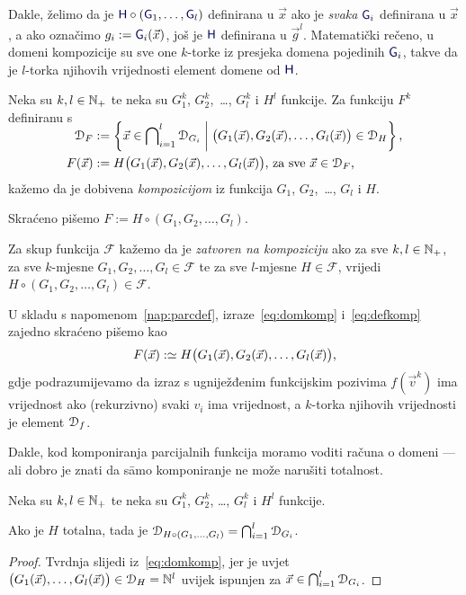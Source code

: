 Dakle, želimo da je $\f H\circ(\f G_1,\dotsc,\f G_l)$ definirana u $\vec x$ ako je \emph{svaka} $\f G_i$ definirana u $\vec x$, a ako označimo $g_i:=\f G_i(\vec x)$, još je $\f H$ definirana u $\vec g^{l}$. Matematički rečeno, u domeni kompozicije su sve one $k$-torke iz presjeka domena pojedinih $\f G_i$, takve da je $l$-torka njihovih vrijednosti element domene od $\f H$.
\begin{definicija}[{name=[kompozicija]}]
Neka su $k,l\in{\mathbb N}_+$ te neka su $G_1^k$, $G_2^k$,~\ldots, $G_l^k$ i $H^l$ funkcije. Za funkciju $F^k$ definiranu s
\begin{align}
\SwapAboveDisplaySkip
\label{eq:domkomp}
    \dom{F}&:=\left\{\vec x\in\bigcap\nolimits_{i=1}^l\dom{G_i}\;\middle|\;\bigl(G_1(\vec x),G_2(\vec x),\dotsc,G_l(\vec x)\bigr)\in\dom{H}\right\}\text,\\
\label{eq:defkomp}
    F(\vec x)&:=H\bigl(G_1(\vec x),G_2(\vec x),\dotsc,G_l(\vec x)\bigr)\text{, za sve $\vec x\in\dom F$,}
\end{align}
kažemo da je dobivena \emph{kompozicijom} iz funkcija $G_1$, $G_2$,~\ldots, $G_l$ i $H$.

	Skraćeno pišemo $F:=H\circ(G_1,G_2,\dotsc,G_l)$. %

Za skup funkcija $\mathcal F$ kažemo da je \emph{zatvoren na kompoziciju} ako za sve $k,l\in{\mathbb N}_+$, za sve $k$-mjesne $G_1,G_2,\dotsc,G_l\in\mathcal F$ te za sve $l$-mjesne $H\in\mathcal F$, vrijedi $H\circ(G_1,G_2,\dotsc,G_l)\in\mathcal F$.
\end{definicija}
U skladu s napomenom~\ref{nap:parcdef}, izraze~\eqref{eq:domkomp} i~\eqref{eq:defkomp} zajedno skraćeno pišemo kao
\begin{equation}
    F(\vec x):\simeq H\bigl(G_1(\vec x),G_2(\vec x),\dotsc,G_l(\vec x)\bigr)\text,
\end{equation}
gdje podrazumijevamo da izraz s ugniježđenim funkcijskim pozivima $f(\vec v^{k})$ ima vrijednost ako (rekurzivno) svaki $v_i$ ima vrijednost, a $k$-torka njihovih vrijednosti je element $\mathcal D_{f}$.

Dakle, kod komponiranja parcijalnih funkcija moramo voditi računa o domeni --- ali dobro je znati da s\=amo komponiranje ne može narušiti totalnost.

\begin{lema}[{name=[domena kompozicije slijeva s totalnom funkcijom]}]\label{lm:comptot}
    Neka su $k,l\in{\mathbb N}_+$ te neka su $G_1^k$, $G_2^k$, \ldots, $G_l^k$ i $H^l$ funkcije.
    
    Ako je $H$ totalna, tada je $\mathcal D_{H\circ(G_1,\dotsc,G_l)}=\bigcap_{i=1}^l\mathcal D_{G_i}$.
\end{lema}
\begin{proof}
    Tvrdnja slijedi iz~\eqref{eq:domkomp}, jer je uvjet $\bigl(G_1(\vec x),\dotsc,G_l(\vec x)\bigr)\in\mathcal D_{H}={\mathbb N}^l$ uvijek ispunjen za $\vec x\in\bigcap_{i=1}^l\mathcal D_{G_i}$.
\end{proof}

